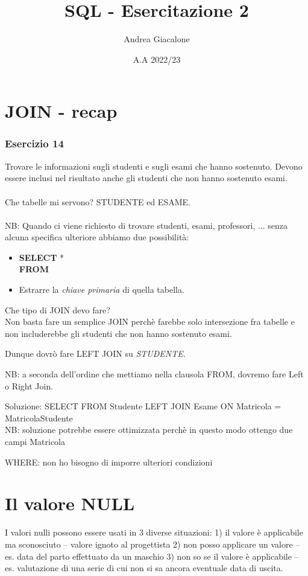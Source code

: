 \documentclass{article}
\title{SQL - Esercitazione 2}
\author{Andrea Giacalone}
\date{A.A 2022/23}
\begin{document}
\maketitle

\section{JOIN - recap}
\subsubsection{Esercizio 14}
Trovare le informazioni sugli studenti e sugli esami che hanno sostenuto. Devono essere inclusi nel risultato anche gli studenti che non hanno sostenuto esami.\\
\\

Che tabelle mi servono? STUDENTE ed ESAME.\\
\\

NB: Quando ci viene richiesto di trovare studenti, esami, professori, ... senza alcuna specifica ulteriore abbiamo due possibilità:\\
    \begin{itemize}
        \item\textbf{SELECT} *\\
        \textbf{FROM}
        \item Estrarre la \emph{chiave primaria} di quella tabella.\\
    \end{itemize}

Che tipo di JOIN devo fare?\\

Non basta fare un semplice JOIN perchè farebbe solo intersezione fra tabelle e non includerebbe gli studenti che non hanno sostenuto esami.

Dunque dovrò fare LEFT JOIN su \emph{STUDENTE}.

NB: a seconda dell'ordine che mettiamo nella clausola FROM, dovremo fare Left o Right Join.

    Soluzione:
        SELECT
        FROM Studente LEFT JOIN Esame ON
            Matricola = MatricolaStudente\\
        NB: soluzione potrebbe essere ottimizzata perchè in questo modo ottengo
            due campi Matricola

        WHERE: non ho bisogno di imporre ulteriori condizioni

\section{Il valore NULL}
I valori nulli possono essere usati in 3 diverse situazioni:
    1) il valore è applicabile ma sconosciuto -- valore ignoto al progettista
    2) non posso applicare un valore -- es. data del parto effettuato da un maschio
    3) non so se il valore è applicabile  -- es. valutazione di una serie di cui non si sa ancora eventuale data di uscita.
\end{document}
